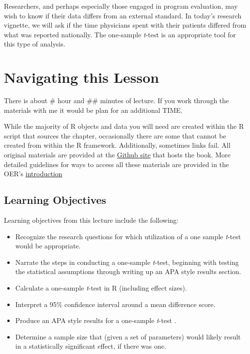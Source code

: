 \documentclass[
  11pt,
]{book}
\providecommand{\tightlist}{%
  \setlength{\itemsep}{0pt}\setlength{\parskip}{0pt}}
\begin{document}
Researchers, and perhaps especially those engaged in program evaluation, may wish to know if their data differs from an external standard. In today's research vignette, we will ask if the time physicians spent with their patients differed from what was reported nationally. The one-sample \emph{t}-test is an appropriate tool for this type of analysis.

\hypertarget{navigating-this-lesson-2}{%
\section{Navigating this Lesson}\label{navigating-this-lesson-2}}

There is about \# hour and \#\# minutes of lecture. If you work through the materials with me it would be plan for an additional TIME.

While the majority of R objects and data you will need are created within the R script that sources the chapter, occasionally there are some that cannot be created from within the R framework. Additionally, sometimes links fail. All original materials are provided at the \href{https://github.com/lhbikos/ReCenterPsychStats}{Github site} that hosts the book. More detailed guidelines for ways to access all these materials are provided in the OER's \protect\hyperlink{ReCintro}{introduction}

\hypertarget{learning-objectives-2}{%
\subsection{Learning Objectives}\label{learning-objectives-2}}

Learning objectives from this lecture include the following:

\begin{itemize}
\tightlist
\item
  Recognize the research questions for which utilization of a one sample \emph{t}-test would be appropriate.
\item
  Narrate the steps in conducting a one-sample \emph{t}-test, beginning with testing the statistical assumptions through writing up an APA style results section.
\item
  Calculate a one-sample \emph{t}-test in R (including effect sizes).
\item
  Interpret a 95\% confidence interval around a mean difference score.
\item
  Produce an APA style results for a one-sample \emph{t}-test .
\item
  Determine a sample size that (given a set of parameters) would likely result in a statistically significant effect, if there was one.
\end{itemize}
\end{document}
